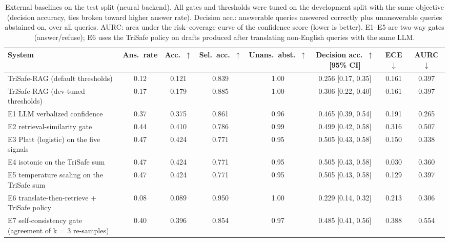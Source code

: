 \begin{table}[t]
  \caption{External baselines on the test split (neural backend). All gates and thresholds were tuned on the development split with the same objective (decision accuracy, ties broken toward higher answer rate). Decision acc.: answerable queries answered correctly plus unanswerable queries abstained on, over all queries. AURC: area under the risk--coverage curve of the confidence score (lower is better). E1--E5 are two-way gates (answer/refuse); E6 uses the TriSafe policy on drafts produced after translating non-English queries with the same LLM.}
  \label{tab:external-neural}
  \footnotesize
  \setlength{\tabcolsep}{4pt}
  \begin{tabular}{lccccccc}
    \toprule
    System & Ans.\ rate & Acc.\ $\uparrow$ & Sel.\ acc.\ $\uparrow$ & Unans.\ abst.\ $\uparrow$ & Decision acc.\ $\uparrow$ [95\% CI] & ECE $\downarrow$ & AURC $\downarrow$ \\
    \midrule
    TriSafe-RAG (default thresholds) & 0.12 & 0.121 & 0.839 & 1.00 & 0.256 [0.17, 0.35] & 0.161 & 0.397 \\
    TriSafe-RAG (dev-tuned thresholds) & 0.17 & 0.179 & 0.885 & 1.00 & 0.306 [0.22, 0.40] & 0.161 & 0.397 \\
    E1 LLM verbalized confidence & 0.37 & 0.375 & 0.861 & 0.96 & 0.465 [0.39, 0.54] & 0.191 & 0.265 \\
    E2 retrieval-similarity gate & 0.44 & 0.410 & 0.786 & 0.99 & 0.499 [0.42, 0.58] & 0.316 & 0.507 \\
    E3 Platt (logistic) on the five signals & 0.47 & 0.424 & 0.771 & 0.95 & 0.505 [0.43, 0.58] & 0.150 & 0.338 \\
    E4 isotonic on the TriSafe sum & 0.47 & 0.424 & 0.771 & 0.95 & 0.505 [0.43, 0.58] & 0.030 & 0.360 \\
    E5 temperature scaling on the TriSafe sum & 0.47 & 0.424 & 0.771 & 0.95 & 0.505 [0.43, 0.58] & 0.129 & 0.397 \\
    E6 translate-then-retrieve + TriSafe policy & 0.08 & 0.089 & 0.950 & 1.00 & 0.229 [0.14, 0.32] & 0.213 & 0.306 \\
    E7 self-consistency gate (agreement of k = 3 re-samples) & 0.40 & 0.396 & 0.854 & 0.97 & 0.485 [0.41, 0.56] & 0.388 & 0.554 \\
    \bottomrule
  \end{tabular}
\end{table}
